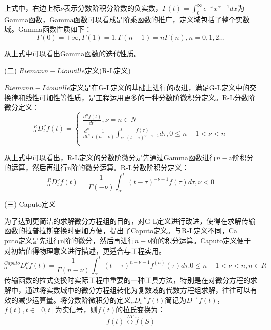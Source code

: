\begin{enumerate}
上式中，右边上标$\nu$表示分数阶积分阶数的负实数，$\Gamma \left( t \right)=\int_{0}^{\infty }{{{e}^{-x}}{{x}^{\alpha -1}}dx}$为\\Gamma函数，Gamma函数可以看成是阶乘函数的推广，定义域包括了整个实数域。Gamma函数性质如下：
\begin{equation}
\Gamma \left( 0 \right)=\pm \infty ,\Gamma \left( 1 \right)=1,\Gamma \left( n+1 \right)=n\Gamma \left( n \right),n=0,1,2\ldots 
\end{equation}

从上式中可以看出Gamma函数的迭代性质。

(二) $Riemann-Liouville$定义(R-L定义)

$Riemann-Liouville$定义是在G-L定义的基础上进行的改进，满足G-L定义中的交换律和线性可加性等性质，是工程运用更多的一种分数阶微积分定义。R-L分数阶微分定义：
\begin{equation}
{}_{\alpha }^{R}D_{t}^{\nu }f(t)=\left\{ \begin{matrix}
   \frac{{{d}^{n}}f\left( t \right)}{d{{t}^{n}}},\nu =n\in N  \\
   \frac{{{d}^{n}}}{d{{t}^{n}}}\frac{1}{\Gamma \left( n-\nu  \right)}\int_{\alpha }^{t}{\frac{f\left( \tau  \right)}{{{\left( t-\tau  \right)}^{\upsilon -n+1}}}d\tau ,0\le n-1<\nu <n}  \\
\end{matrix} \right.
\end{equation}

从上式中可以看出，R-L定义的分数阶微分是先通过Gamma函数进行$n-\nu $阶积分的运算，然后再进行n阶的微分运算。R-L分数阶积分定义：
\begin{equation}
{}_{\alpha }^{R}D_{t}^{\nu }f(t)=\frac{1}{\Gamma \left( -\nu  \right)}\int_{\alpha }^{t}{{{\left( t-\tau  \right)}^{-\nu -1}}f\left( \tau  \right)}d\tau ,\nu <0
\end{equation}

(三)	Caputo定义

为了达到更简洁的求解微分方程组的目的，对G-L定义进行改进，使得在求解传输函数的拉普拉斯变换时更加方便，提出了Caputo定义。与R-L定义不同，Ca\\puto定义是先进行n阶的微分，然后再进行$n-\nu $阶的积分运算。Caputo定义便于对初始值得物理意义进行描述，更适合与工程实用。
\begin{equation}
{}_{\alpha }^{Caputo}D_{t}^{\nu }f(t)=\frac{1}{\Gamma \left( n-\nu  \right)}\int_{\alpha }^{t}{{{\left( t-\tau  \right)}^{n-\nu -1}}{{f}^{\left( n \right)}}\left( \tau  \right)}d\tau .0\le n-1<\nu <n,n\in R
\end{equation}
传输函数的拉式变换时实际工程中重要的一种工具方法，特别是在对微分方程的求解中，通过将实数域中的微分方程组转化为复数域的代数方程组求解，往往可以有效的减少运算量。将分数阶微积分的定义${}_{\alpha }D_{t}^{-\nu }f(t)$简记为${{D}^{-v}}f(t)$，$f(t),t\in \left[ 0,t \right]$为实信号，则$f(t)$的拉氏变换为：
\begin{equation}
f(t)\overset{LT}{\longleftrightarrow}\widehat{f}\left( S \right)
\end{equation}


\end{enumerate}
